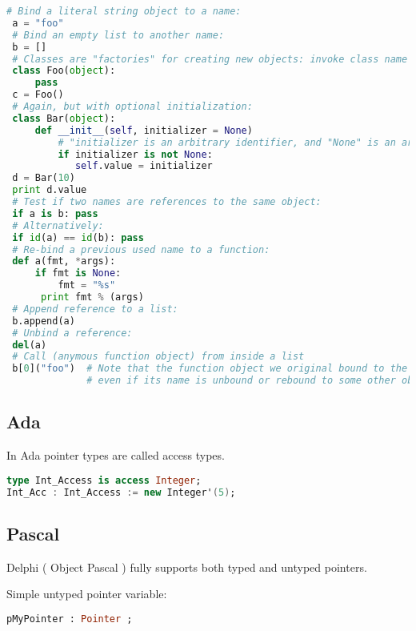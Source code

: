 \documentclass[12pt]{book}
\begin{document}
\lstset{style=mystyle}
\begin{lstlisting}[language=Python, caption=Python example]
 # Bind a literal string object to a name:
 a = "foo"
 # Bind an empty list to another name:
 b = []
 # Classes are "factories" for creating new objects: invoke class name as a function:
 class Foo(object):
     pass
 c = Foo()
 # Again, but with optional initialization:
 class Bar(object):
     def __init__(self, initializer = None)
         # "initializer is an arbitrary identifier, and "None" is an arbitrary default value
         if initializer is not None:
            self.value = initializer
 d = Bar(10)
 print d.value
 # Test if two names are references to the same object:
 if a is b: pass
 # Alternatively:
 if id(a) == id(b): pass
 # Re-bind a previous used name to a function:
 def a(fmt, *args):
     if fmt is None:
         fmt = "%s"
      print fmt % (args)
 # Append reference to a list:
 b.append(a)
 # Unbind a reference:
 del(a)
 # Call (anymous function object) from inside a list
 b[0]("foo")  # Note that the function object we original bound to the name "a" continues to exist
              # even if its name is unbound or rebound to some other object.
\end{lstlisting}

\subsection{Ada}

In Ada pointer types are called access types.


\lstset{style=mystyle}
\begin{lstlisting}[language=Ada, caption=Ada example]
type Int_Access is access Integer;
Int_Acc : Int_Access := new Integer'(5);
\end{lstlisting}





\subsection{Pascal}

Delphi ( Object Pascal ) fully supports both typed and untyped pointers.

Simple untyped pointer variable:


\lstset{style=mystyle}
\begin{lstlisting}[language=Pascal, caption=Pascal example]
pMyPointer : Pointer ;
\end{lstlisting}
\end{document}
